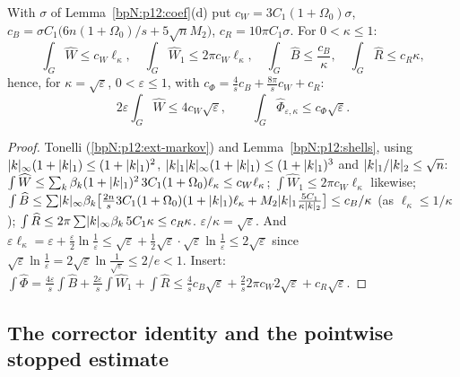 \begin{proposition}\label{bpN:p12:envelopes}
With $\sigma$ of Lemma~\ref{bpN:p12:coef}(d) put $c_W=3C_1(1+\Omega_0)\sigma$, $c_B=\sigma C_1\bigl(6n(1+\Omega_0)/s+5\sqrt nM_2\bigr)$, $c_R=10\pi C_1\sigma$. For $0<\kappa\le1$:
\[\int_G\widehat W\le c_W\ell_\kappa,\quad\int_G\widehat W_1\le2\pi c_W\ell_\kappa,\quad\int_G\widehat B\le\frac{c_B}\kappa,\quad\int_G\widehat R\le c_R\kappa,\]
hence, for $\kappa=\sqrt\varepsilon$, $0<\varepsilon\le1$, with $c_\Phi=\frac4sc_B+\frac{8\pi}sc_W+c_R$:
\[2\varepsilon\int_G\widehat W\le4c_W\sqrt\varepsilon,\qquad\int_G\widehat\Phi_{\varepsilon,\kappa}\le c_\Phi\sqrt\varepsilon .\]
\end{proposition}
\begin{proof}
\label{stepN:p12:en-term} Tonelli (\ref{bpN:p12:ext-markov}) and Lemma~\ref{bpN:p12:shells}, using $\lvert k\rvert_\infty(1+\lvert k\rvert_1)\le(1+\lvert k\rvert_1)^2$, $\lvert k\rvert_1\lvert k\rvert_\infty(1+\lvert k\rvert_1)\le(1+\lvert k\rvert_1)^3$ and $\lvert k\rvert_1/\lvert k\rvert_2\le\sqrt n$:
$\int\widehat W\le\sum_k\beta_k(1+\lvert k\rvert_1)^2\,3C_1(1+\Omega_0)\ell_\kappa\le c_W\ell_\kappa$; $\int\widehat W_1\le2\pi c_W\ell_\kappa$ likewise; $\int\widehat B\le\sum\lvert k\rvert_\infty\beta_k\bigl[\frac{2n}s3C_1(1+\Omega_0)(1+\lvert k\rvert_1)\ell_\kappa+M_2\lvert k\rvert_1\frac{5C_1}{\kappa\lvert k\rvert_2}\bigr]\le c_B/\kappa$ (as $\ell_\kappa\le1/\kappa$); $\int\widehat R\le2\pi\sum\lvert k\rvert_\infty\beta_k\,5C_1\kappa\le c_R\kappa$.
\label{stepN:p12:en-choice} $\varepsilon/\kappa=\sqrt\varepsilon$. And $\varepsilon\ell_\kappa=\varepsilon+\frac\varepsilon2\ln\frac1\varepsilon\le\sqrt\varepsilon+\frac12\sqrt\varepsilon\cdot\sqrt\varepsilon\ln\frac1\varepsilon\le2\sqrt\varepsilon$ since $\sqrt\varepsilon\ln\frac1\varepsilon=2\sqrt\varepsilon\ln\frac1{\sqrt\varepsilon}\le2/e<1$. Insert: $\int\widehat\Phi=\frac{4\varepsilon}s\int\widehat B+\frac{2\varepsilon}s\int\widehat W_1+\int\widehat R\le\frac4sc_B\sqrt\varepsilon+\frac{2}{s}2\pi c_W2\sqrt\varepsilon+c_R\sqrt\varepsilon$.
\end{proof}

\subsection{The corrector identity and the pointwise stopped estimate}\label{bpN:p12:s-point}


